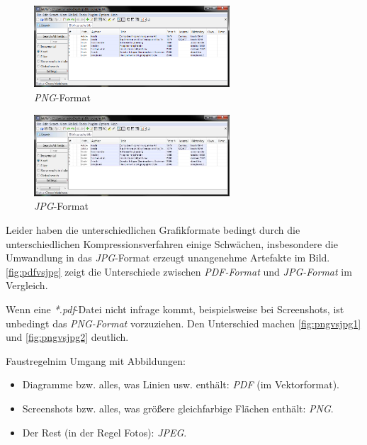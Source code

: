 \begin{figure}[p]
	\centering
  \includegraphics[width=0.65\textwidth]{Examples/jabref.png}
   \caption{\textit{PNG}-Format}
  \label{fig:pngvsjpg1}
\end{figure}

\begin{figure}[p]
	\centering
  \includegraphics[width=0.65\textwidth]{Examples/jabref.jpg}
   \caption{\textit{JPG}-Format}
  \label{fig:pngvsjpg2}
\end{figure}

Leider haben die unterschiedlichen Grafikformate bedingt durch die unterschiedlichen Kompressionsverfahren einige Schwächen, insbesondere die Umwandlung in das \textit{JPG}-Format erzeugt unangenehme Artefakte im Bild. \autoref{fig:pdfvsjpg} zeigt die Unterschiede zwischen \textit{PDF-Format} und \textit{JPG-Format} im Vergleich. 

Wenn eine \textit{*.pdf}-Datei nicht infrage kommt, beispielsweise bei Screenshots, ist unbedingt das \textit{PNG-Format} vorzuziehen. 
Den Unterschied machen \autoref{fig:pngvsjpg1} und \autoref{fig:pngvsjpg2} deutlich.

\glqq Faustregeln\grqq im Umgang mit Abbildungen:
\begin{itemize}
	\item Diagramme bzw. alles, was Linien usw. enthält: \textit{PDF} (im Vektorformat).
	\item Screenshots bzw. alles, was größere gleichfarbige Flächen enthält: \textit{PNG}.
	\item Der Rest (in der Regel Fotos): \textit{JPEG}.
\end{itemize}




